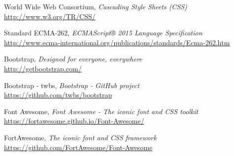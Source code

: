 \begin{thebibliography}{99}
	World Wide Web Consortium, \emph{Cascading Style Sheets (CSS)} \\
	\url{http://www.w3.org/TR/CSS/}
	
	Standard ECMA-262, \emph{ECMAScript® 2015 Language Specification} \\
	\url{http://www.ecma-international.org/publications/standards/Ecma-262.htm}
	
	Bootstrap, \emph{Designed for everyone, everywhere} \\
	\url{http://getbootstrap.com/}

	Bootstrap - twbs, \emph{Bootstrap - GitHub project} \\
	\url{https://github.com/twbs/bootstrap}
	
	Font Awesome, \emph{Font Awesome - The iconic font and CSS toolkit} \\
	\url{https://fortawesome.github.io/Font-Awesome/}

	FortAwesome, \emph{The iconic font and CSS framework} \\
	\url{https://github.com/FortAwesome/Font-Awesome}

	
\end{thebibliography}
